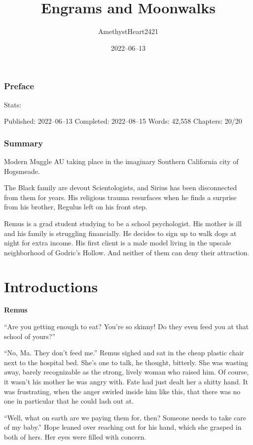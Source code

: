 \documentclass[12pt,twoside,openright]{memoir}
\title{Engrams and Moonwalks}
\author{AmethystHeart2421}
\date{2022--06--13}
\begin{document}
	
\maketitle

\subsection[Preface]{Preface}

Stats: 

Published: 2022--06--13 Completed: 2022--08--15 Words: 42,558 Chapters: 20/20 

\subsection[Summary]{Summary}
Modern Muggle AU taking place in the imaginary Southern California city of Hogsmeade.

The Black family are devout Scientologists, and Sirius has been disconnected from them for years. His religious trauma resurfaces when he finds a surprise from his brother, Regulus left on his front step.

Remus is a grad student studying to be a school psychologist. His mother is ill and his family is struggling financially. He decides to sign up to walk dogs at night for extra income. His first client is a male model living in the upscale neighborhood of Godric's Hollow. And neither of them can deny their attraction.
\pagebreak
\tableofcontents
\clearpage\setcounter{page}{1}
\pagebreak
\chapter{Introductions}

\textbf{Remus} 

``Are you getting enough to eat? You're so skinny! Do they even feed you at that school of yours?'' 

``No, Ma. They don't feed me.'' Remus sighed and sat in the cheap plastic chair next to the hospital bed. She's one to talk, he thought, bitterly. She was wasting away, barely recognizable as the strong, lively woman who raised him. Of course, it wasn't his mother he was angry with. Fate had just dealt her a shitty hand. It was frustrating, when the anger swirled inside him like this, that there was no one in particular that he could lash out at. 

``Well, what on earth are we paying them for, then? Someone needs to take care of my baby.'' Hope leaned over reaching out for his hand, which she grasped in both of hers. Her eyes were filled with concern. 
\end{document}
